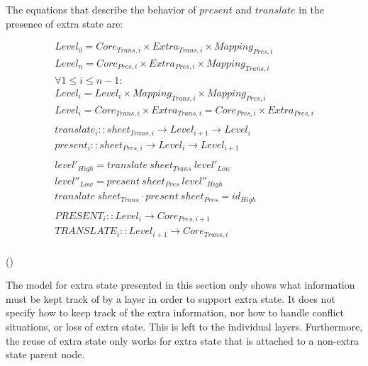 The equations that describe the behavior of $present$ and $translate$ in the presence of extra state are:

\begin{small}\begin{align*}%
Level_{0} = Core_{Trans,i} \times Extra_{Trans,i} \times Mapping_{Pres,i}\\
Level_{n} = Core_{Pres,i} \times Extra_{Pres,i} \times Mapping_{Trans,i}\\
\forall 1 \le i \le n-1:  \\
Level_{i} = Level_{i} \times Mapping_{Trans,i} \times Mapping_{Pres,i}\\
Level_{i} = Core_{Trans,i} \times Extra_{Trans,i} = Core_{Pres,i} \times Extra_{Pres,i} \\
\\
translate_{i} :: sheet_{Trans,i} \rightarrow Level_{i+1} \rightarrow Level_{i}\\
present_{i} :: sheet_{Pres,i}  \rightarrow  Level_{i} \rightarrow Level_{i+1}\\
\\
level'_{High} = translate~sheet_{Trans}~level'_{Low}\\
level''_{Low} = present~sheet_{Pres}~level''_{High}\\
translate~sheet_{Trans}  \cdot present~sheet_{Pres} = id_{High}\\
\\
PRESENT_{i} :: Level_{i} \rightarrow Core_{Pres,i+1}\\
TRANSLATE_{i} :: Level_{i+1} \rightarrow Core_{Trans,i}\\
\end{align*} 
\end{small}
{\centering ()\\}

The model for extra state presented in this section only shows what information must be kept track of by a layer in order to support extra state. It does not specify how to keep track of the extra information, nor how to handle conflict situations, or loss of extra state. This is left to the individual layers. Furthermore, the reuse of extra state only works for extra state that is attached to a non-extra state parent node. 

